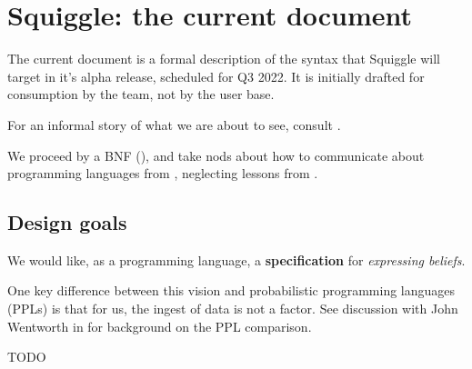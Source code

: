\documentclass[../main.tex]{subfiles}
\begin{document}
\section{Squiggle: the current document}

The current document is a formal description of the syntax that Squiggle will target in it's alpha release, scheduled for Q3 2022. It is initially drafted for consumption by the team, not by the user base.

For an informal story of what we are about to see, consult \cite{@SqgCodePlan}.

We proceed by a BNF (\cite{@BNFWiki}), and take nods about how to communicate about programming languages from \cite{@CraftingInterpreters, Appendix I}, neglecting lessons from \cite{@PFPL}.

\subsection{Design goals}

We would like, as a programming language, a \textbf{specification} for \textit{expressing beliefs}.

One key difference between this vision and probabilistic programming languages (PPLs) is that for us, the ingest of data is not a factor. See discussion with John Wentworth in \cite{@SqgSequence} for background on the PPL comparison.

TODO
\end{document}
